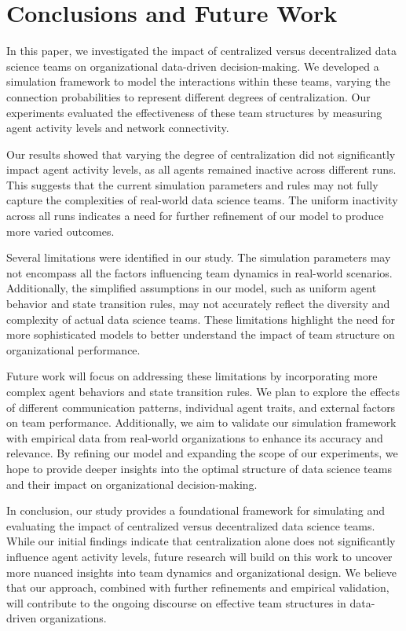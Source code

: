 \documentclass{article} %
\begin{document}
\section{Conclusions and Future Work}
\label{sec:conclusion}

In this paper, we investigated the impact of centralized versus decentralized data science teams on organizational data-driven decision-making. We developed a simulation framework to model the interactions within these teams, varying the connection probabilities to represent different degrees of centralization. Our experiments evaluated the effectiveness of these team structures by measuring agent activity levels and network connectivity.

Our results showed that varying the degree of centralization did not significantly impact agent activity levels, as all agents remained inactive across different runs. This suggests that the current simulation parameters and rules may not fully capture the complexities of real-world data science teams. The uniform inactivity across all runs indicates a need for further refinement of our model to produce more varied outcomes.

Several limitations were identified in our study. The simulation parameters may not encompass all the factors influencing team dynamics in real-world scenarios. Additionally, the simplified assumptions in our model, such as uniform agent behavior and state transition rules, may not accurately reflect the diversity and complexity of actual data science teams. These limitations highlight the need for more sophisticated models to better understand the impact of team structure on organizational performance.

Future work will focus on addressing these limitations by incorporating more complex agent behaviors and state transition rules. We plan to explore the effects of different communication patterns, individual agent traits, and external factors on team performance. Additionally, we aim to validate our simulation framework with empirical data from real-world organizations to enhance its accuracy and relevance. By refining our model and expanding the scope of our experiments, we hope to provide deeper insights into the optimal structure of data science teams and their impact on organizational decision-making.

In conclusion, our study provides a foundational framework for simulating and evaluating the impact of centralized versus decentralized data science teams. While our initial findings indicate that centralization alone does not significantly influence agent activity levels, future research will build on this work to uncover more nuanced insights into team dynamics and organizational design. We believe that our approach, combined with further refinements and empirical validation, will contribute to the ongoing discourse on effective team structures in data-driven organizations.






\end{document}
